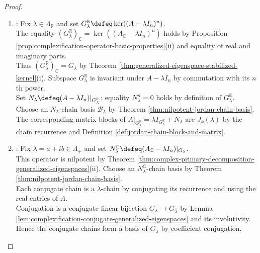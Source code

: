 \begin{theorem}
\begin{proof}
\begin{enumerate}[label=(\roman*)]
\begin{enumerate}[label=(\alph*)]
The spectrum is the disjoint union of $\Lambda_{\mathbb{R}}$, $\Lambda_+$, and $\overline{\Lambda_+}$ by Corollary \ref{cor:complexification-conjugate-eigenvalue-multiplicities}(i).\\
Hence $\mathbb{C}^n=\bigoplus\limits_{\lambda\in\Lambda_{\mathbb{R}}}G_{\lambda}\oplus\bigoplus\limits_{\lambda\in\Lambda_+}(G_{\lambda}\oplus G_{\overline{\lambda}})$ by Theorem \ref{thm:complex-primary-decomposition-generalized-eigenspaces}(i).
\item {}: Fix $\lambda\in\Lambda_{\mathbb{R}}$ and set $G_{\lambda}^{\mathbb{R}}\defeq\ker((A-\lambda I_n)^n)$.\\
The equality $(G_{\lambda}^{\mathbb{R}})_{\mathbb{C}}=\ker((A_{\mathbb{C}}-\lambda I_n)^n)$ holds by Proposition \ref{prop:complexification-operator-basic-properties}(ii) and equality of real and imaginary parts.\\
Thus $(G_{\lambda}^{\mathbb{R}})_{\mathbb{C}}=G_{\lambda}$ by Theorem \ref{thm:generalized-eigenspace-stabilized-kernel}(i). Subspace $G_{\lambda}^{\mathbb{R}}$ is invariant under $A-\lambda I_n$ by commutation with its $n$th power.\\
Set $N_{\lambda}\defeq(A-\lambda I_n)|_{G_{\lambda}^{\mathbb{R}}}$; equality $N_{\lambda}^n=0$ holds by definition of $G_{\lambda}^{\mathbb{R}}$. Choose an $N_{\lambda}$-chain basis $\mathcal{B}_{\lambda}$ by Theorem \ref{thm:nilpotent-jordan-chain-basis}.\\
The corresponding matrix blocks of $A|_{G_{\lambda}^{\mathbb{R}}}=\lambda I_{G_{\lambda}^{\mathbb{R}}}+N_{\lambda}$ are $J_k(\lambda)$ by the chain recurrence and Definition \ref{def:jordan-chain-block-and-matrix}.
\item {}: Fix $\lambda=a+ib\in\Lambda_+$ and set $N_{\lambda}^{\mathbb{C}}\defeq(A_{\mathbb{C}}-\lambda I_n)|_{G_{\lambda}}$.\\
This operator is nilpotent by Theorem \ref{thm:complex-primary-decomposition-generalized-eigenspaces}(ii). Choose an $N_{\lambda}^{\mathbb{C}}$-chain basis by Theorem \ref{thm:nilpotent-jordan-chain-basis}.\\
Each conjugate chain is a $\overline{\lambda}$-chain by conjugating its recurrence and using the real entries of $A$.\\
Conjugation is a conjugate-linear bijection $G_{\lambda}\to G_{\overline{\lambda}}$ by Lemma \ref{lem:complexification-conjugate-generalized-eigenspaces} and its involutivity.\\
Hence the conjugate chains form a basis of $G_{\overline{\lambda}}$ by coefficient conjugation.\\

\end{enumerate}
\end{enumerate}
\end{proof}
\end{theorem}
